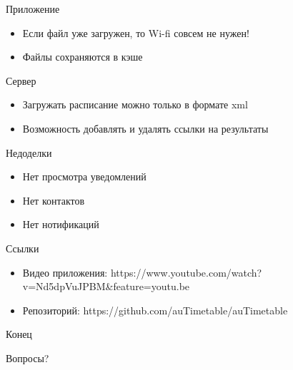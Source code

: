 \documentclass[12pt]{beamer}
\begin{document}
\begin{frame}{Приложение}
    
    \begin{itemize}

    \item <1-> Если файл уже загружен,
               то Wi-fi совсем не нужен!

    \item <2-> Файлы сохраняются в кэше

    \end{itemize}

\end{frame}

\begin{frame}{Сервер}
    
    \begin{itemize}

    \item <1-> Загружать расписание можно только в формате xml

    \item <2-> Возможность добавлять и удалять ссылки на результаты

    \end{itemize}

\end{frame}

\begin{frame}{Недоделки}
    
    \begin{itemize}

    \item <1-> Нет просмотра уведомлений

    \item <2-> Нет контактов

    \item <2-> Нет нотификаций

    \end{itemize}

\end{frame}

\begin{frame}{Ссылки}
    
    \begin{itemize}

        \item <1-> Видео приложения: https://www.youtube.com/watch?v=Nd5dpVuJPBM\&feature=youtu.be

        \item <2-> Репозиторий: https://github.com/auTimetable/auTimetable

    \end{itemize}

\end{frame}

\begin{frame}{Конец}

    Вопросы?

\end{frame}
\end{document}
